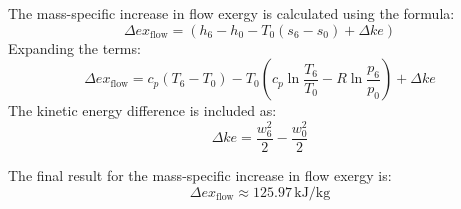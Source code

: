 The mass-specific increase in flow exergy is calculated using the formula:  
\[
\Delta ex_{\text{flow}} = (h_6 - h_0 - T_0 (s_6 - s_0) + \Delta ke)
\]  
Expanding the terms:  
\[
\Delta ex_{\text{flow}} = c_p (T_6 - T_0) - T_0 \left( c_p \ln \frac{T_6}{T_0} - R \ln \frac{p_6}{p_0} \right) + \Delta ke
\]  
The kinetic energy difference is included as:  
\[
\Delta ke = \frac{w_6^2}{2} - \frac{w_0^2}{2}
\]  

The final result for the mass-specific increase in flow exergy is:  
\[
\Delta ex_{\text{flow}} \approx 125.97 \, \text{kJ/kg}
\]